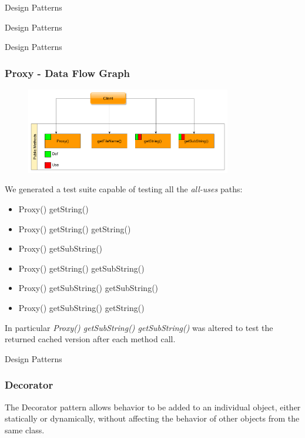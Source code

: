 \documentclass{beamer}
\begin{document}
\begin{section}{Design Patterns}
\begin{subsection}{Design Patterns}
\begin{frame}
	\end{frame}
\end{subsection}



\begin{subsection}{Design Patterns}
	\begin{frame}
		\frametitle{Proxy - Data Flow Graph}
		\begin{figure}[!h]
		\centering
		\includegraphics[width=0.8\textwidth]{./Proxy/CallGraph.png}
		
		\label{Prodataflow}
	\end{figure}
		{\footnotesize We generated a test suite capable of testing all the \textit{all-uses} paths:
		\begin{itemize}
			\item Proxy() getString() 
			\item Proxy() getString() getString()
			\item Proxy() getSubString()
			\item Proxy() getString() getSubString()
			\item Proxy() getSubString() getSubString()
			\item Proxy() getSubString() getString()			
		\end{itemize}
		}In particular  \textit{Proxy() getSubString() getSubString()} was altered to test the returned cached version after each method call. 		
	\end{frame}
\end{subsection}

\begin{subsection}{Design Patterns}
	\begin{frame}
		\frametitle{Decorator}
		The Decorator pattern allows behavior to be added to an individual object, either statically or dynamically, without affecting the behavior of other objects from the same class.


\end{frame}
\end{subsection}
\end{section}
\end{document}
